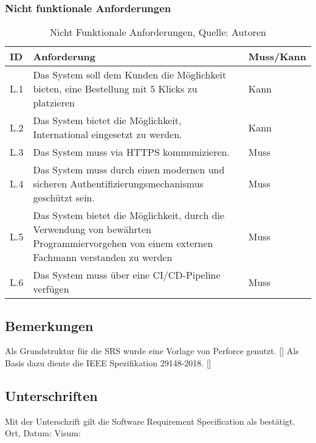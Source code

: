 \subsubsection{Nicht funktionale Anforderungen}
\begin{table}[H]
	\setlength\extrarowheight{2pt} %
	\begin{tabularx}{\textwidth}{|l|X|l|}
		\hline
		\textbf{ID} &  \textbf{Anforderung} & \textbf{Muss/Kann}  \\
        \hline
		L.1 & Das System soll dem Kunden die Möglichkeit bieten, eine Bestellung mit 5 Klicks zu platzieren  & Kann \\
		\hline
		L.2 & Das System bietet die Möglichkeit, International eingesetzt zu werden. & Kann \\
		\hline
		L.3 & Das System muss via HTTPS kommunizieren. & Muss \\
		\hline
		L.4 & Das System muss durch einen modernen und sicheren Authentifizierungsmechanismus geschützt sein. & Muss \\
		\hline
		L.5 & Das System bietet die Möglichkeit, durch die Verwendung von bewährten Programmiervorgehen von einem externen Fachmann verstanden zu werden & Muss \\
		\hline
		L.6 & Das System muss über eine CI/CD-Pipeline verfügen & Muss \\
	\end{tabularx}
	\caption{ \label{tbl: NichtFunktionaleAnforderungent}Nicht Funktionale Anforderungen, Quelle: Autoren}
\end{table}
\newpage
\subsection{Bemerkungen}
Als Grundstruktur für die SRS wurde eine Vorlage von Perforce genutzt. [\cite{srsdocument}]
Als Basis dazu diente die IEEE Spezifikation 29148-2018. [\cite{ieeeSrs}]

\subsection{Unterschriften}
Mit der Unterschrift gilt die Software Requirement Specification als bestätigt.\\

Ort, Datum:	\underline{\hspace*{6cm}}	\hspace*{1cm} Visum:	\underline{\hspace*{4cm}}


\newpage
